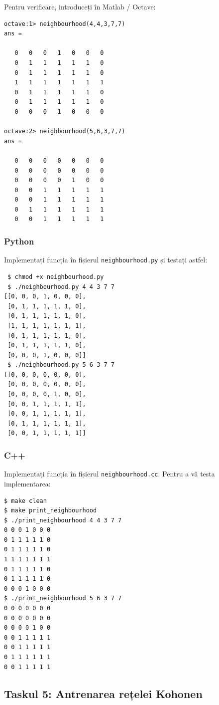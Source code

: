 \documentclass[12pt]{article}%
\newcommand{\pyt}{{\color{cadmiumgreen} Python}}
\newcommand{\cc}{{\color{cobalt} C++}}
\begin{document}
Pentru verificare, introduceți în {\color{red} Matlab / Octave}:
\begin{verbatim}
octave:1> neighbourhood(4,4,3,7,7)
ans =

   0   0   0   1   0   0   0
   0   1   1   1   1   1   0
   0   1   1   1   1   1   0
   1   1   1   1   1   1   1
   0   1   1   1   1   1   0
   0   1   1   1   1   1   0
   0   0   0   1   0   0   0

octave:2> neighbourhood(5,6,3,7,7)
ans =

   0   0   0   0   0   0   0
   0   0   0   0   0   0   0
   0   0   0   0   1   0   0
   0   0   1   1   1   1   1
   0   0   1   1   1   1   1
   0   1   1   1   1   1   1
   0   0   1   1   1   1   1
\end{verbatim}


\subsubsection*{\pyt}
\label{sec:pyt4}

Implementați funcția în fișierul \texttt{neighbourhood.py} și testați
astfel:
\begin{verbatim}
 $ chmod +x neighbourhood.py
 $ ./neighbourhood.py 4 4 3 7 7
[[0, 0, 0, 1, 0, 0, 0],
 [0, 1, 1, 1, 1, 1, 0],
 [0, 1, 1, 1, 1, 1, 0],
 [1, 1, 1, 1, 1, 1, 1],
 [0, 1, 1, 1, 1, 1, 0],
 [0, 1, 1, 1, 1, 1, 0],
 [0, 0, 0, 1, 0, 0, 0]]
 $ ./neighbourhood.py 5 6 3 7 7
[[0, 0, 0, 0, 0, 0, 0],
 [0, 0, 0, 0, 0, 0, 0],
 [0, 0, 0, 0, 1, 0, 0],
 [0, 0, 1, 1, 1, 1, 1],
 [0, 0, 1, 1, 1, 1, 1],
 [0, 1, 1, 1, 1, 1, 1],
 [0, 0, 1, 1, 1, 1, 1]]
\end{verbatim}

\subsubsection*{\cc}
\label{sec:cc4}

Implementați funcția în fișierul \texttt{neighbourhood.cc}. Pentru a
vă testa implementarea:
\begin{verbatim}
$ make clean
$ make print_neighbourhood
$ ./print_neighbourhood 4 4 3 7 7
0 0 0 1 0 0 0
0 1 1 1 1 1 0
0 1 1 1 1 1 0
1 1 1 1 1 1 1
0 1 1 1 1 1 0
0 1 1 1 1 1 0
0 0 0 1 0 0 0
$ ./print_neighbourhood 5 6 3 7 7
0 0 0 0 0 0 0
0 0 0 0 0 0 0
0 0 0 0 1 0 0
0 0 1 1 1 1 1
0 0 1 1 1 1 1
0 1 1 1 1 1 1
0 0 1 1 1 1 1
\end{verbatim}

\subsection{Taskul 5: Antrenarea rețelei Kohonen}
\label{sec:task5}
\end{document}
